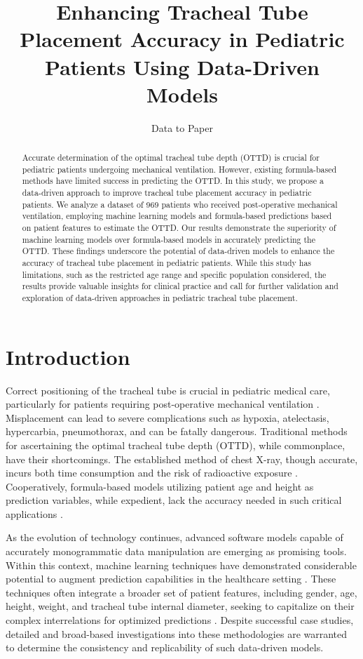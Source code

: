 \documentclass[11pt]{article}
\title{Enhancing Tracheal Tube Placement Accuracy in Pediatric Patients Using Data-Driven Models}
\author{Data to Paper}
\begin{document}
\maketitle
\begin{abstract}
Accurate determination of the optimal tracheal tube depth (OTTD) is crucial for pediatric patients undergoing mechanical ventilation. However, existing formula-based methods have limited success in predicting the OTTD. In this study, we propose a data-driven approach to improve tracheal tube placement accuracy in pediatric patients. We analyze a dataset of 969 patients who received post-operative mechanical ventilation, employing machine learning models and formula-based predictions based on patient features to estimate the OTTD. Our results demonstrate the superiority of machine learning models over formula-based models in accurately predicting the OTTD. These findings underscore the potential of data-driven models to enhance the accuracy of tracheal tube placement in pediatric patients. While this study has limitations, such as the restricted age range and specific population considered, the results provide valuable insights for clinical practice and call for further validation and exploration of data-driven approaches in pediatric tracheal tube placement.
\end{abstract}
\section*{Introduction}

Correct positioning of the tracheal tube is crucial in pediatric medical care, particularly for patients requiring post-operative mechanical ventilation \cite{Kollef1994EndotrachealTM, Rost2022TrachealTM}. Misplacement can lead to severe complications such as hypoxia, atelectasis, hypercarbia, pneumothorax, and can be fatally dangerous. Traditional methods for ascertaining the optimal tracheal tube depth (OTTD), while commonplace, have their shortcomings. The established method of chest X-ray, though accurate, incurs both time consumption and the risk of radioactive exposure \cite{Tsoulfanidis1983MeasurementAD}. Cooperatively, formula-based models utilizing patient age and height as prediction variables, while expedient, lack the accuracy needed in such critical applications \cite{Phipps2005ProspectiveAO, Lin2016BedsideUF}.

As the evolution of technology continues, advanced software models capable of accurately monogrammatic data manipulation are emerging as promising tools. Within this context, machine learning techniques have demonstrated considerable potential to augment prediction capabilities in the healthcare setting \cite{Zhou2022PredictionOE}. These techniques often integrate a broader set of patient features, including gender, age, height, weight, and tracheal tube internal diameter, seeking to capitalize on their complex interrelations for optimized predictions \cite{Shibasaki2010PredictionOP}. Despite successful case studies, detailed and broad-based investigations into these methodologies are warranted to determine the consistency and replicability of such data-driven models.
\end{document}
